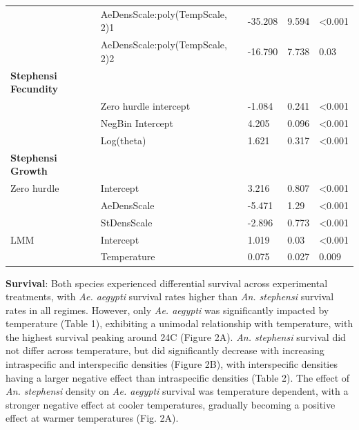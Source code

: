 \documentclass[12pt,]{article}
\begin{document}
\begin{table}[]
\begin{tabular}{lllll}
                             & AeDensScale:poly(TempScale, 2)1 & -35.208                 & 9.594               & \textless0.001         \\
                             & AeDensScale:poly(TempScale, 2)2 & -16.790                 & 7.738               & 0.03                   \\
\hline
\textbf{Stephensi Fecundity} &                                 &                         &                     &                        \\
                             & Zero hurdle intercept           & -1.084                  & 0.241               & \textless0.001         \\
                             & NegBin Intercept                & 4.205                   & 0.096               & \textless0.001         \\
                             & Log(theta)                      & 1.621                   & 0.317               & \textless0.001         \\
\hline
\textbf{Stephensi Growth}    &                                 &                         &                     &                        \\
Zero hurdle                  & Intercept                       & 3.216                   & 0.807               & \textless0.001         \\
                             & AeDensScale                     & -5.471                  & 1.29                & \textless0.001         \\
                             & StDensScale                     & -2.896                  & 0.773               & \textless0.001         \\
LMM                          & Intercept                       & 1.019                   & 0.03                & \textless0.001         \\
                             & Temperature                     & 0.075                   & 0.027               & 0.009
\end{tabular}
\end{table}


\textbf{Survival}: Both species experienced differential survival across
experimental treatments, with \emph{Ae. aegypti} survival rates higher
than \emph{An. stephensi} survival rates in all regimes. However, only
\emph{Ae. aegypti} was significantly impacted by temperature (Table 1),
exhibiting a unimodal relationship with temperature, with the highest
survival peaking around 24C (Figure 2A). \emph{An. stephensi} survival
did not differ across temperature, but did significantly decrease with
increasing intraspecific and interspecific densities (Figure 2B), with
interspecific densities having a larger negative effect than
intraspecific densities (Table 2). The effect of \emph{An. stephensi}
density on \emph{Ae. aegypti} survival was temperature dependent, with a
stronger negative effect at cooler temperatures, gradually becoming a
positive effect at warmer temperatures (Fig. 2A).
\end{document}

